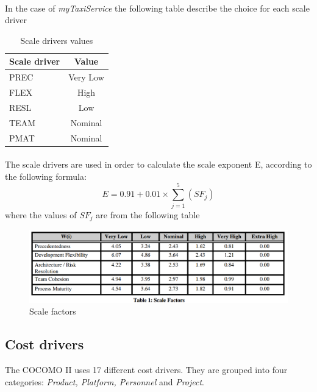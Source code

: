 \paragraph{} In the case of \textit{myTaxiService} the following table describe the choice for each scale driver
\begin{table}[H]
\centering
\begin{tabular}{l | c}
\textbf{Scale driver} & \textbf{Value}\\ \hline
PREC & Very Low \\ \hline
FLEX & High \\ \hline
RESL & Low \\ \hline
TEAM & Nominal \\ \hline
PMAT & Nominal 
\end{tabular}
\caption{Scale drivers values}
\end{table}
\paragraph{} The scale drivers are used in order to calculate the scale exponent E, according to the following formula:
$$E = 0.91 + 0.01 \times \sum_{j = 1}^{5}(SF_j)$$
where the values of $SF_j$ are from the following table
\begin{figure}[H]
\centering
\includegraphics[scale = 0.35]{Size_Cost_Effort/scaleFactors}
\caption{Scale factors}
\end{figure}
\subsection{Cost drivers}
The COCOMO II uses 17 different cost drivers. They are grouped into four categories: \textit{Product, Platform, Personnel} and \textit{Project}.

